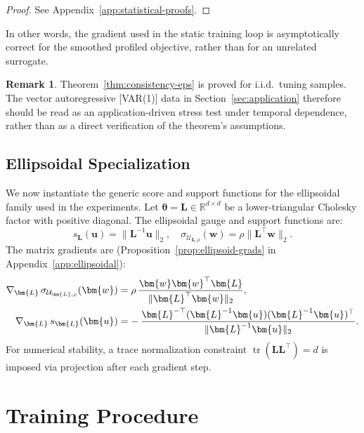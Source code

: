 \documentclass[11pt]{article}
\newcommand{\R}{\mathbb{R}}
\newcommand{\cU}{\mathcal{U}}
\newcommand{\norm}[1]{\|#1\|}
\newcommand{\btheta}{\bm{\theta}}
\newcommand{\bu}{\bm{u}}
\newcommand{\bw}{\bm{w}}
\newcommand{\bL}{\bm{L}}
\DeclareMathOperator{\tr}{tr}
\theoremstyle{definition}
\newtheorem{remark}{Remark}
\begin{document}
\begin{proof}
See Appendix~\ref{app:statistical-proofs}.
\end{proof}

In other words, the gradient used in the static training loop is asymptotically correct for the smoothed profiled objective, rather than for an unrelated surrogate.

\begin{remark}
Theorem~\ref{thm:consistency-eps} is proved for i.i.d.\ tuning samples. The vector autoregressive [VAR(1)] data in Section~\ref{sec:application} therefore should be read as an application-driven stress test under temporal dependence, rather than as a direct verification of the theorem's assumptions.
\end{remark}

\subsection{Ellipsoidal Specialization}

We now instantiate the generic score and support functions for the ellipsoidal family used in the experiments. Let $\btheta = \bL \in \R^{d \times d}$ be a lower-triangular Cholesky factor with positive diagonal. The ellipsoidal gauge and support functions are:
\begin{equation}
s_{\bL}(\bu) = \norm{\bL^{-1} \bu}_2, \quad
\sigma_{\cU_{\bL,\rho}}(\bw) = \rho \norm{\bL^\top \bw}_2.
\end{equation}
The matrix gradients are (Proposition~\ref{prop:ellipsoid-grads} in Appendix~\ref{app:ellipsoidal}):
\begin{align}\label{eq:grad-sigma-L}
\nabla_{\bL}\,\sigma_{\cU_{\bL,\rho}}(\bw) &= \rho\,\frac{\bw\bw^\top\bL}{\|\bL^\top\bw\|_2}, \\
\nabla_{\bL}\,s_{\bL}(\bu) &= -\,\frac{\bL^{-\top}(\bL^{-1}\bu)(\bL^{-1}\bu)^\top}{\|\bL^{-1}\bu\|_2}. \notag
\end{align}
For numerical stability, a trace normalization constraint $\tr(\bL\bL^\top) = d$ is imposed via projection after each gradient step.

\section{Training Procedure}
\label{sec:algorithm}
\end{document}
